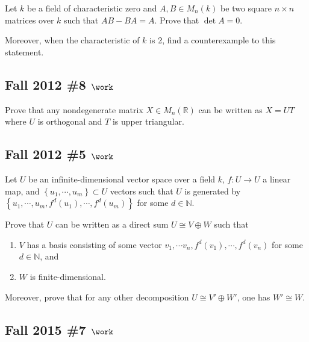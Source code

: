 Let \(k\) be a field of characteristic zero and \(A, B \in M_n(k)\) be
two square \(n\times n\) matrices over \(k\) such that \(AB - BA = A\).
Prove that \(\operatorname{det}A = 0\).

Moreover, when the characteristic of \(k\) is 2, find a counterexample
to this statement.

\hypertarget{fall-2012-8-work}{%
\subsection{\texorpdfstring{Fall 2012 \#8
\(\work\)}{Fall 2012 \#8 \textbackslash work}}\label{fall-2012-8-work}}

Prove that any nondegenerate matrix \(X\in M_n({\mathbb{R}})\) can be
written as \(X = UT\) where \(U\) is orthogonal and \(T\) is upper
triangular.

\hypertarget{fall-2012-5-work}{%
\subsection{\texorpdfstring{Fall 2012 \#5
\(\work\)}{Fall 2012 \#5 \textbackslash work}}\label{fall-2012-5-work}}

Let \(U\) be an infinite-dimensional vector space over a field \(k\),
\(f: U\to U\) a linear map, and
\(\left\{{u_1, \cdots, u_m}\right\} \subset U\) vectors such that \(U\)
is generated by
\(\left\{{u_1, \cdots, u_m, f^d(u_1), \cdots, f^d(u_m)}\right\}\) for
some \(d\in {\mathbb{N}}\).

Prove that \(U\) can be written as a direct sum \(U \cong V\oplus W\)
such that

\begin{enumerate}
\def\labelenumi{\arabic{enumi}.}
\tightlist
\item
  \(V\) has a basis consisting of some vector
  \(v_1, \cdots v_n, f^d(v_1), \cdots, f^d(v_n)\) for some
  \(d\in {\mathbb{N}}\), and
\item
  \(W\) is finite-dimensional.
\end{enumerate}

Moreover, prove that for any other decomposition
\(U \cong V' \oplus W'\), one has \(W' \cong W\).

\hypertarget{fall-2015-7-work}{%
\subsection{\texorpdfstring{Fall 2015 \#7
\(\work\)}{Fall 2015 \#7 \textbackslash work}}\label{fall-2015-7-work}}

